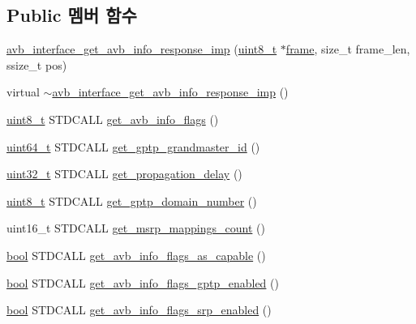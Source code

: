 \subsection*{Public 멤버 함수}
\begin{DoxyCompactItemize}
\item 
\hyperlink{classavdecc__lib_1_1avb__interface__get__avb__info__response__imp_a512ba1f457a64e7de6e5a89e3f1c4bb3}{avb\+\_\+interface\+\_\+get\+\_\+avb\+\_\+info\+\_\+response\+\_\+imp} (\hyperlink{stdint_8h_aba7bc1797add20fe3efdf37ced1182c5}{uint8\+\_\+t} $\ast$\hyperlink{gst__avb__playbin_8c_ac8e710e0b5e994c0545d75d69868c6f0}{frame}, size\+\_\+t frame\+\_\+len, ssize\+\_\+t pos)
\item 
virtual \hyperlink{classavdecc__lib_1_1avb__interface__get__avb__info__response__imp_a115903c2cf3fe3e65f828592b79274c9}{$\sim$avb\+\_\+interface\+\_\+get\+\_\+avb\+\_\+info\+\_\+response\+\_\+imp} ()
\item 
\hyperlink{stdint_8h_aba7bc1797add20fe3efdf37ced1182c5}{uint8\+\_\+t} S\+T\+D\+C\+A\+LL \hyperlink{classavdecc__lib_1_1avb__interface__get__avb__info__response__imp_a9462f9211613dbb51e4741a0b7174489}{get\+\_\+avb\+\_\+info\+\_\+flags} ()
\item 
\hyperlink{parse_8c_aec6fcb673ff035718c238c8c9d544c47}{uint64\+\_\+t} S\+T\+D\+C\+A\+LL \hyperlink{classavdecc__lib_1_1avb__interface__get__avb__info__response__imp_addfa67bfe7d7660b056764a6d1c3ad8c}{get\+\_\+gptp\+\_\+grandmaster\+\_\+id} ()
\item 
\hyperlink{parse_8c_a6eb1e68cc391dd753bc8ce896dbb8315}{uint32\+\_\+t} S\+T\+D\+C\+A\+LL \hyperlink{classavdecc__lib_1_1avb__interface__get__avb__info__response__imp_a198b1f5be1c9134066a4c2339ae39989}{get\+\_\+propagation\+\_\+delay} ()
\item 
\hyperlink{stdint_8h_aba7bc1797add20fe3efdf37ced1182c5}{uint8\+\_\+t} S\+T\+D\+C\+A\+LL \hyperlink{classavdecc__lib_1_1avb__interface__get__avb__info__response__imp_a71292cb9f5119b187373981917a09480}{get\+\_\+gptp\+\_\+domain\+\_\+number} ()
\item 
uint16\+\_\+t S\+T\+D\+C\+A\+LL \hyperlink{classavdecc__lib_1_1avb__interface__get__avb__info__response__imp_af9729f00c3c69a8e538087e084d6f895}{get\+\_\+msrp\+\_\+mappings\+\_\+count} ()
\item 
\hyperlink{avb__gptp_8h_af6a258d8f3ee5206d682d799316314b1}{bool} S\+T\+D\+C\+A\+LL \hyperlink{classavdecc__lib_1_1avb__interface__get__avb__info__response__imp_af5a14f7a5ffabe03de9c28afd3f7b642}{get\+\_\+avb\+\_\+info\+\_\+flags\+\_\+as\+\_\+capable} ()
\item 
\hyperlink{avb__gptp_8h_af6a258d8f3ee5206d682d799316314b1}{bool} S\+T\+D\+C\+A\+LL \hyperlink{classavdecc__lib_1_1avb__interface__get__avb__info__response__imp_a9c8fd93a48043692606d4f913687f2e4}{get\+\_\+avb\+\_\+info\+\_\+flags\+\_\+gptp\+\_\+enabled} ()
\item 
\hyperlink{avb__gptp_8h_af6a258d8f3ee5206d682d799316314b1}{bool} S\+T\+D\+C\+A\+LL \hyperlink{classavdecc__lib_1_1avb__interface__get__avb__info__response__imp_a30a1ad254e7adbc13d77b1d5f4342df6}{get\+\_\+avb\+\_\+info\+\_\+flags\+\_\+srp\+\_\+enabled} ()
\end{DoxyCompactItemize}
